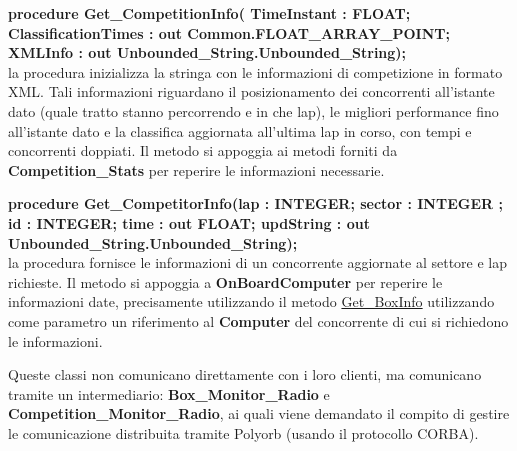 \begin{description}
\item{\textbf{procedure Get\_CompetitionInfo( TimeInstant : FLOAT; ClassificationTimes : out Common.FLOAT\_ARRAY\_POINT; XMLInfo : out Unbounded\_String.Unbounded\_String);}}\\
la procedura inizializza la stringa con le informazioni di competizione in formato XML. Tali informazioni riguardano il posizionamento
dei concorrenti all'istante dato (quale tratto stanno percorrendo e in che lap), le migliori performance fino all'istante dato e la classifica
aggiornata all'ultima lap in corso, con tempi e concorrenti doppiati. Il metodo si appoggia ai metodi forniti da \textbf{Competition\_Stats}
per reperire le informazioni necessarie.
\item{\textbf{procedure Get\_CompetitorInfo(lap : INTEGER; sector : INTEGER ; id : INTEGER; time : out FLOAT; updString : out Unbounded\_String.Unbounded\_String);}}\\
la procedura fornisce le informazioni di un concorrente aggiornate al settore e lap richieste. Il metodo si appoggia a \textbf{OnBoardComputer}
per reperire le informazioni date, precisamente utilizzando il metodo \underline{Get\_BoxInfo} utilizzando come parametro un riferimento
al \textbf{Computer} del concorrente di cui si richiedono le informazioni.
\end{description}
Queste classi non comunicano direttamente con i loro clienti, ma comunicano tramite un intermediario: \textbf{Box\_Monitor\_Radio} e 
\textbf{Competition\_Monitor\_Radio}, ai quali viene demandato il compito di gestire le comunicazione distribuita tramite Polyorb (usando
il protocollo CORBA).
\newpage
